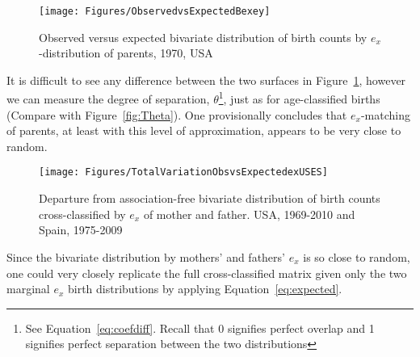 \begin{figure}[ht!]
        \centering  
          \caption{Observed versus expected bivariate
          distribution of birth counts by $e_x$-distribution of parents, 1970,
          USA}
           \texttt{[image: Figures/ObservedvsExpectedBexey]}
          \label{fig:US1970obsexpex}
\end{figure}

It is
difficult to see any difference between the two surfaces in
Figure~\ref{fig:US1970obsexpex}, however we can measure the degree of
separation, $\theta$\footnote{See Equation~\eqref{eq:coefdiff}. Recall that 0 signifies
perfect overlap and 1 signifies perfect separation between the two
distributions}, just as for age-classified births (Compare with
Figure~\ref{fig:Theta}). One provisionally concludes that $e_x$-matching of
parents, at least with this level of approximation, appears to be very close to random.

\begin{figure}[ht!]
        \centering  
          \caption{Departure from association-free bivariate distribution of
          birth counts cross-classified by $e_x$ of mother and father. USA,
          1969-2010 and Spain, 1975-2009}
           \texttt{[image: Figures/TotalVariationObsvsExpectedexUSES]}
          \label{fig:TotalVarobsexpex}
\end{figure}

Since the bivariate distribution by mothers' and fathers' $e_x$ is so close
to random, one could very closely replicate the full cross-classified matrix 
given only the two marginal
$e_x$ birth distributions by applying Equation~\eqref{eq:expected}. 




